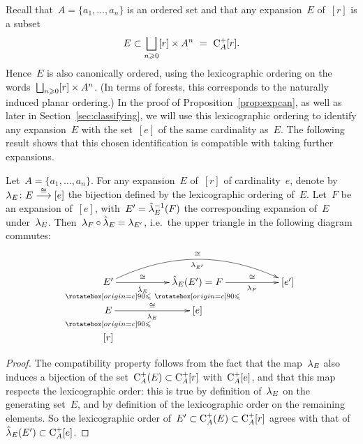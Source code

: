 Recall that~$A=\{a_1,\dots,a_n\}$ is an ordered set and that any expansion~$E$ of~$[r]$ is a subset 
$$E\subset \bigsqcup_{n\geqslant 0}[r]\times A^n\ =\ \mathrm{C}_A^+[r].$$
Hence~$E$ is also canonically ordered, using the lexicographic ordering on the words~$\bigsqcup_{n\geqslant 0}[r]\times A^n$.  (In terms of forests, this corresponds to the naturally induced planar ordering.) 
In the proof of Proposition~\ref{prop:expcan}, as well as later in Section~\ref{sec:classifying}, we will use this lexicographic ordering to identify any expansion~$E$ with the set~$[e]$ of the same cardinality as~$E$. 
The following result shows that this chosen identification is compatible with taking further expansions. 

\begin{lem}\label{lem:lexi}
Let~$A=\{a_1,\dots,a_n\}$. For any expansion~$E$ of~$[r]$ of cardinality~$e$, denote by~$\lambda_E\colon E \stackrel{\cong}{\longrightarrow} [e]$ the bijection defined by the lexicographic ordering of~$E$. 
Let~$F$ be an expansion of~$[e]$, with~$E'=\hat{\lambda}_E^{-1}(F)$ the corresponding expansion of~$E$ under~$\lambda_E$. Then~$\lambda_F\circ \hat{\lambda}_E=\lambda_{E'}$, i.e.~the upper triangle in the following diagram commutes:  
\begin{equation}\label{equ:EF}
\xymatrix@R-1pc{E'\ar@{}[d]|{\IV} \ar[rr]^-\cong_-{\hat \la_E} \ar@/^2pc/[rrrr]^-\cong_-{\la_{E'}} && \hat\la_E(E')=F \ar@{}[d]|{\IV} \ar[rr]^-\cong_-{\la_F} && [e']\\
 E \ar@{}[d]|{\IV}\ar[rr]^-\cong_-{\la_E} &&  [e]& & \\
[r] &  & &&
}\end{equation}
\end{lem}

\begin{proof}
The compatibility property follows from the fact that the map~$\lambda_E$ also induces a bijection of the set~$\mathrm{C}_A^+(E)\subset \mathrm{C}_A^+[r]$ with~$\mathrm{C}_A^+[e]$, and that this map respects the lexicographic order: this is true by definition of~$\lambda_E$ on the generating set~$E$, and by definition of the lexicographic order on the remaining elements. So the lexicographic order of~$E'\subset \mathrm{C}_A^+(E)\subset \mathrm{C}_A^+[r]$ agrees with that of~$\hat{\lambda}_E(E')\subset \mathrm{C}_A^+[e]$. 
\end{proof}

